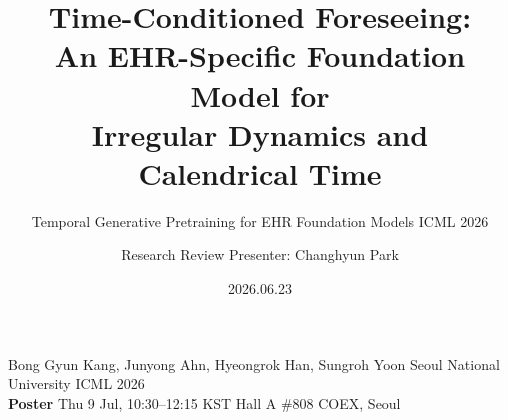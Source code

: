 \documentclass[10pt, aspectratio=169, t]{beamer}   %
\title[TCF: EHR Foundation Model]{Time-Conditioned Foreseeing:\\ An EHR-Specific Foundation Model for\\ Irregular Dynamics and Calendrical Time}
\subtitle{Temporal Generative Pretraining for EHR Foundation Models \textperiodcentered{} ICML 2026}
\author[Research Review]{Research Review \quad\textbar\quad Presenter: Changhyun Park}
\date{2026.06.23}
\newcommand{\figcap}[1]{{\color{muted}\scriptsize #1}}
\begin{document}
\begin{frame}
  \titlepage
  \begin{center}
    \figcap{Bong Gyun Kang, Junyong Ahn, Hyeongrok Han, Sungroh Yoon \textperiodcentered{} Seoul National University \textperiodcentered{} ICML 2026}\\[5pt]
    {\color{accent}\scriptsize \textbf{Poster} \textperiodcentered{} Thu 9 Jul, 10:30--12:15 KST \textperiodcentered{} Hall A \#808 \textperiodcentered{} COEX, Seoul}
  \end{center}
\end{frame}

\end{document}
